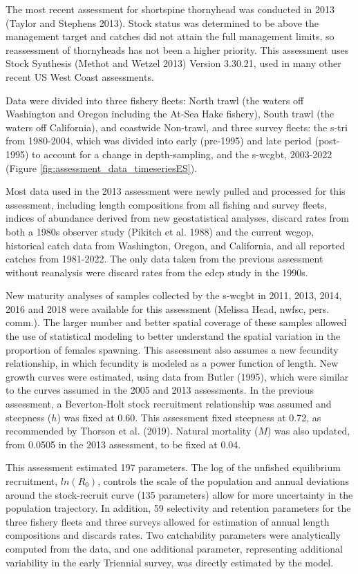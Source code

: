 \documentclass[11pt,
  letterpaper,
]{article}
\begin{document}
The most recent assessment for shortspine thornyhead was conducted in 2013 (Taylor and Stephens 2013). Stock status was determined to be above the management target and catches did not attain the full management limits, so reassessment of thornyheads has not been a higher priority. This assessment uses Stock Synthesis (Methot and Wetzel 2013) Version 3.30.21, used in many other recent US West Coast assessments.

Data were divided into three fishery fleets: North trawl (the waters off Washington and Oregon including the At-Sea Hake fishery), South trawl (the waters off California), and coastwide Non-trawl, and three survey fleets: the \gls{s-tri} from 1980-2004, which was divided into early (pre-1995) and late period (post-1995) to account for a change in depth-sampling, and the \gls{s-wcgbt}, 2003-2022 (Figure \ref{fig:assessment_data_timeseriesES}).

Most data used in the 2013 assessment were newly pulled and processed for this assessment, including length compositions from all fishing and survey fleets, indices of abundance derived from new geostatistical analyses, discard rates from both a 1980s observer study (Pikitch et al. 1988) and the current \gls{wcgop}, historical catch data from Washington, Oregon, and California, and all reported catches from 1981-2022. The only data taken from the previous assessment without reanalysis were discard rates from the \gls{edcp} study in the 1990s.

New maturity analyses of samples collected by the \gls{s-wcgbt} in 2011, 2013, 2014, 2016 and 2018 were available for this assessment (Melissa Head, \gls{nwfsc}, pers. comm.). The larger number and better spatial coverage of these samples allowed the use of statistical modeling to better understand the spatial variation in the proportion of females spawning. This assessment also assumes a new fecundity relationship, in which fecundity is modeled as a power function of length. New growth curves were estimated, using data from Butler (1995), which were similar to the curves assumed in the 2005 and 2013 assessments. In the previous assessment, a Beverton-Holt stock recruitment relationship was assumed and steepness (\(h\)) was fixed at 0.60. This assessment fixed steepness at 0.72, as recommended by Thorson et al. (2019). Natural mortality (\(M\)) was also updated, from 0.0505 in the 2013 assessment, to be fixed at 0.04.

This assessment estimated 197 parameters. The log of the unfished equilibrium recruitment, \(ln(R_0)\), controls the scale of the population and annual deviations around the stock-recruit curve (135 parameters) allow for more uncertainty in the population trajectory. In addition, 59 selectivity and retention parameters for the three fishery fleets and three surveys allowed for estimation of annual length compositions and discards rates. Two catchability parameters were analytically computed from the data, and one additional parameter, representing additional variability in the early Triennial survey, was directly estimated by the model.
\end{document}
